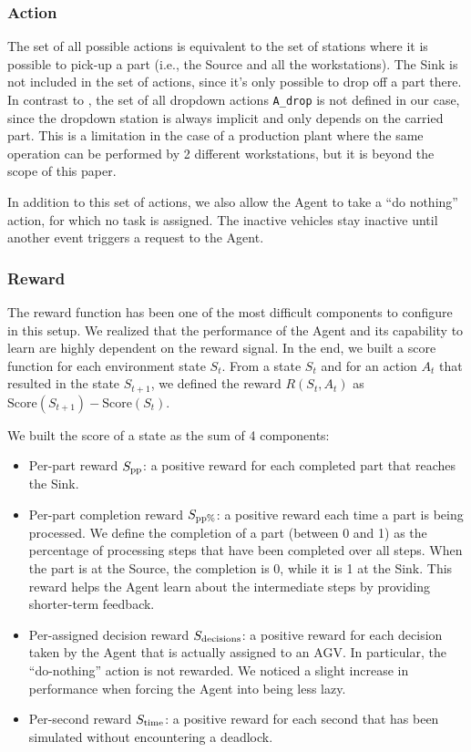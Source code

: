 \documentclass[sn-mathphys]{sn-jnl}
\begin{document}
\subsubsection{Action}

The set of all possible actions is equivalent to the set of stations where it is possible to pick-up a part (i.e., the Source and all the workstations). The Sink is not included in the set of actions, since it’s only possible to drop off a part there. In contrast to \cite{Mayer2021}, the set of all dropdown actions \texttt{A\_drop} is not defined in our case, since the dropdown station is always implicit and only depends on the carried part. This is a limitation in the case of a production plant where the same operation can be performed by 2 different workstations, but it is beyond the scope of this paper.

In addition to this set of actions, we also allow the Agent to take a “do no\-thing” action, for which no task is assigned. The inactive vehicles stay inactive until another event triggers a request to the Agent.

\subsubsection{Reward}

The reward function has been one of the most difficult components to configure in this setup. We realized that the performance of the Agent and its capability to learn are highly dependent on the reward signal. In the end, we built a score function for each environment state $S_t$. From a state $S_t$ and for an action $A_t$ that resulted in the state $S_{t+1}$, we defined the reward $R(S_t, A_t)$ as $\text{Score}(S_{t+1}) - \text{Score}(S_t)$.

We built the score of a state as the sum of 4 components:
\begin{itemize}
    \item Per-part reward $S_{\rm pp}$: a positive reward for each completed part that reaches the Sink.
    \item Per-part completion reward $S_{\rm pp\%}$: a positive reward each time a part is being processed. We define the completion of a part (between 0 and 1) as the percentage of processing steps that have been completed over all steps. When the part is at the Source, the completion is 0, while it is 1 at the Sink. This reward helps the Agent learn about the intermediate steps by providing shorter-term feedback.
    \item Per-assigned decision reward $S_{\rm decisions}$: a positive reward for each decision taken by the Agent that is actually assigned to an AGV. In particular, the “do-nothing” action is not rewarded. We noticed a slight increase in performance when forcing the Agent into being less lazy.
    \item Per-second reward $S_{\rm time}$: a positive reward for each second that has been simulated without encountering a deadlock. 
\end{itemize}
\end{document}
